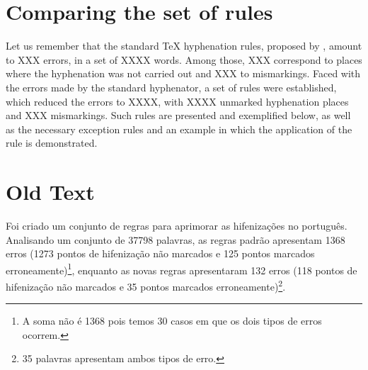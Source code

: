 \documentclass{article}
\begin{document}
\section{Comparing the set of rules} 
Let us remember that the standard \TeX{} hyphenation rules, proposed by
\cite{hyphpt}, amount to XXX errors, in a set of XXXX words.  Among those, XXX
correspond to places where the hyphenation was not carried out and XXX to
mismarkings. Faced with the errors made by the standard hyphenator, a set of
\NumberOfNewRules{} rules were established, which reduced the errors to XXXX,
with XXXX unmarked hyphenation places and XXX mismarkings.  Such rules are
presented and exemplified below, as well as the necessary exception rules and
an example in which the application of the rule is demonstrated.

\section{Old Text}


Foi criado um conjunto de \NumberOfNewRules{} regras para aprimorar as hifenizações no
português. Analisando um conjunto de 37798 palavras, as regras padrão apresentam
1368 erros (1273 pontos de hifenização não marcados e 125 pontos marcados
erroneamente)\footnote{A soma não é 1368 pois temos 30 casos em que os dois
tipos de erros ocorrem.}, enquanto as novas regras apresentaram 132 erros (118
pontos de hifenização não marcados e 35 pontos marcados
erroneamente)\footnote{35 palavras apresentam ambos tipos de erro.}.
\end{document}
